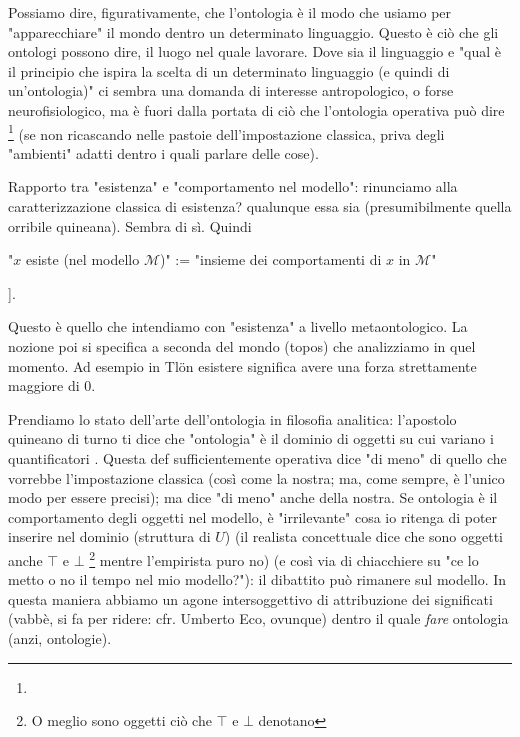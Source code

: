  Possiamo dire, figurativamente, che l'ontologia è il modo che usiamo per "apparecchiare" il mondo dentro un determinato linguaggio. Questo è ciò che gli ontologi possono dire, il luogo nel quale lavorare.
 Dove sia il linguaggio e "qual è il principio che ispira la scelta di un determinato linguaggio (e quindi di un'ontologia)" ci sembra una domanda di interesse antropologico, o forse neurofisiologico, ma è fuori dalla portata di ciò che l'ontologia operativa può dire \footnote{\endde} (se non ricascando nelle pastoie dell'impostazione classica, priva degli "ambienti" adatti dentro i quali parlare delle cose). 
 
 Rapporto tra "esistenza" e "comportamento nel modello": rinunciamo alla caratterizzazione classica di esistenza? qualunque essa sia (presumibilmente quella orribile quineana). Sembra di sì. Quindi 
 \begin{center}
 	"$x$ esiste (nel modello $\mathcal{M}$)" := "insieme dei comportamenti di $x$ in $\mathcal{M}$"
 \end{center}
  \endde]. 
 
 Questo è quello che intendiamo con "esistenza" a livello metaontologico. La nozione poi si specifica a seconda del mondo (topos) che analizziamo in quel momento. Ad esempio in Tl\"on esistere significa avere una forza strettamente maggiore di 0.  

Prendiamo lo stato dell'arte dell'ontologia in filosofia analitica: l'apostolo quineano di turno ti dice che "ontologia" è il dominio di oggetti su cui variano i quantificatori \cite{?}. Questa def sufficientemente operativa dice "di meno" di quello che vorrebbe l'impostazione classica (così come la nostra; ma, come sempre, è l'unico modo per essere precisi); ma dice "di meno" anche della nostra. Se ontologia è il comportamento degli oggetti nel modello, è "irrilevante" cosa io ritenga di poter inserire nel dominio (struttura di $U$) (il realista concettuale dice che sono oggetti anche $\top$ e $\bot$ \footnote{O meglio sono oggetti ciò che $\top$ e $\bot$ denotano} mentre l'empirista puro no) (e così via di chiacchiere su "ce lo metto o no il tempo nel mio modello?"): il dibattito può rimanere sul modello. In questa maniera abbiamo un agone intersoggettivo di attribuzione dei significati (vabbè, si fa per ridere: cfr. Umberto Eco, ovunque) dentro il quale \emph{fare} ontologia (anzi, ontologie).   